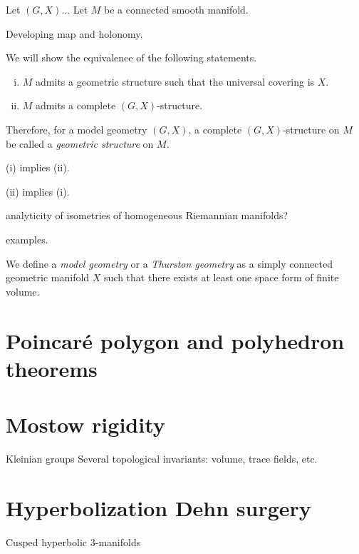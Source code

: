\documentclass{../../large}
\begin{document}
\begin{prb}
Let $(G,X)$...
Let $M$ be a connected smooth manifold.

Developing map and holonomy.

We will show the equivalence of the following statements.
\begin{enumerate}[(i)]
\item $M$ admits a geometric structure such that the universal covering is $X$.
\item $M$ admits a complete $(G,X)$-structure.
\end{enumerate}
Therefore, for a model geometry $(G,X)$, a complete $(G,X)$-structure on $M$ be called a \emph{geometric structure} on $M$.
\begin{parts}
\item (i) implies (ii).
\item (ii) implies (i).
\end{parts}
\end{prb}

analyticity of isometries of homogeneous Riemannian manifolds?

examples.

\begin{prb}
We define a \emph{model geometry} or a \emph{Thurston geometry} as a simply connected geometric manifold $X$ such that there exists at least one space form of finite volume.
\end{prb}

\section{Poincar\'e polygon and polyhedron theorems}



\section{Mostow rigidity}
Kleinian groups
Several topological invariants: volume, trace fields, etc.


\section{Hyperbolization Dehn surgery}

\begin{prb}
Cusped hyperbolic 3-manifolds
\end{prb}
\end{document}
